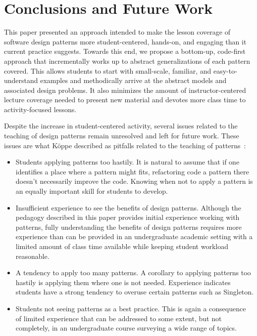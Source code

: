 \documentclass[conference]{IEEEtran}
\begin{document}
\section{Conclusions and Future Work}

This paper presented an approach intended to make the lesson coverage of software design patterns more student-centered, hands-on, and engaging than it current practice suggests. Towards this end, we propose a bottom-up, code-first approach that incrementally works up to abstract generalizations of each pattern covered. This allows students to start with small-scale, familiar, and easy-to-understand examples and methodically arrive at the abstract models and associated design problems. It also minimizes the amount of instructor-centered lecture coverage needed to present new material and devotes more class time to activity-focused lessons.

Despite the increase in student-centered activity, several issues related to the teaching of design patterns remain unresolved and left for future work. These issues are what Köppe described as pitfalls related to the teaching of patterns~\cite{koppe2011}:
\begin{itemize}
\item Students applying patterns too hastily. It is natural to assume that if one identifies a place where a pattern might fits, refactoring code a pattern there doesn't necessarily improve the code. Knowing when not to apply a pattern is an equally important skill for students to develop.
\item Insufficient experience to see the benefits of design patterns. Although the pedagogy described in this paper provides initial experience working with patterns, fully understanding the benefits of design patterns requires more experience than can be provided in an undergraduate academic setting with a limited amount of class time available while keeping student workload reasonable.
\item A tendency to apply too many patterns. A corollary to applying patterns too hastily is applying them where one is not needed. Experience indicates students have a strong tendency to overuse certain patterns such as Singleton.
\item Students not seeing patterns as a best practice. This is again a consequence of limited experience that can be addressed to some extent, but not completely, in an undergraduate course surveying a wide range of topics.
\end{itemize}
\end{document}
